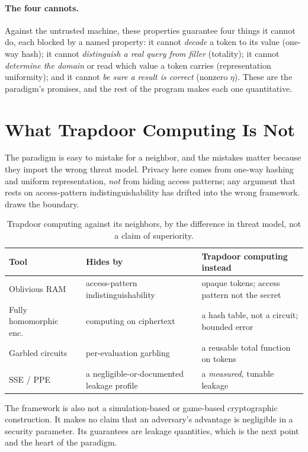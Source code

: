 \documentclass[11pt]{article}
\begin{document}
\paragraph{The four cannots.} Against the untrusted machine, these properties
guarantee four things it cannot do, each blocked by a named property: it cannot
\emph{decode} a token to its value (one-way hash); it cannot \emph{distinguish
a real query from filler} (totality); it cannot \emph{determine the domain} or
read which value a token carries (representation uniformity); and it cannot
\emph{be sure a result is correct} (nonzero $\eta$). These are the paradigm's
promises, and the rest of the program makes each one quantitative.

\section{What Trapdoor Computing Is Not}
\label{sec:not}

The paradigm is easy to mistake for a neighbor, and the mistakes matter because
they import the wrong threat model. Privacy here comes from one-way hashing and
uniform representation, \emph{not} from hiding access patterns; any argument
that rests on access-pattern indistinguishability has drifted into the wrong
framework.  draws the boundary.

\begin{table}[t]
\centering
\caption{Trapdoor computing against its neighbors, by the difference in threat
model, not a claim of superiority.}
\label{tab:not}
\begin{tabular}{@{}l p{3.4cm} p{4.7cm}@{}}
\toprule
Tool & Hides by & Trapdoor computing instead \\
\midrule
Oblivious RAM~\cite{goldreich1996software} & access-pattern indistinguishability & opaque tokens; access pattern not the secret \\
Fully homomorphic enc.~\cite{gentry2009fully} & computing on ciphertext & a hash table, not a circuit; bounded error \\
Garbled circuits & per-evaluation garbling & a reusable total function on tokens \\
SSE / PPE~\cite{curtmola2006searchable,naveed2015inference} & a negligible-or-documented leakage profile & a \emph{measured}, tunable leakage \\
\bottomrule
\end{tabular}
\end{table}

The framework is also not a simulation-based or game-based cryptographic
construction. It makes no claim that an adversary's advantage is negligible in
a security parameter. Its guarantees are leakage quantities, which is the next
point and the heart of the paradigm.
\end{document}
